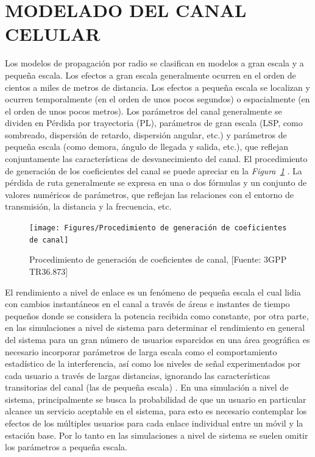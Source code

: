 \section{MODELADO DEL CANAL CELULAR}

Los modelos de propagación por radio se clasifican en modelos a gran escala y a pequeña escala. Los efectos a gran escala generalmente ocurren en el orden de cientos a miles de metros de distancia. Los efectos a pequeña escala se localizan y ocurren temporalmente (en el orden de unos pocos segundos) o espacialmente (en el orden de unos pocos metros). Los parámetros del canal generalmente se dividen en Pérdida por trayectoria (PL), parámetros de gran escala (LSP, como sombreado, dispersión de retardo, dispersión angular, etc.) y parámetros de pequeña escala (como demora, ángulo de llegada y salida, etc.), que reflejan conjuntamente las características de desvanecimiento del canal. El procedimiento de generación de los coeficientes del canal se puede apreciar en la \textit{Figura~\ref{fig:Procedimiento de generacion de coeficientes de canal} }. La pérdida de ruta generalmente se expresa en una o dos fórmulas y un conjunto de valores numéricos de parámetros, que reflejan las relaciones con el entorno de transmisión, la distancia y la frecuencia, etc. \newline

\begin{figure}[th]
\centering
\texttt{[image: Figures/Procedimiento de generación de coeficientes de canal]}
\decoRule
\caption[Procedimiento de generación de coeficientes de canal]{Procedimiento de generación de coeficientes de canal, [Fuente: 3GPP TR36.873]}
\label{fig:Procedimiento de generacion de coeficientes de canal}
\end{figure}

El rendimiento a nivel de enlace es un fenómeno de pequeña escala el cual lidia con cambios instantáneos en el canal a través de áreas e instantes de tiempo pequeños donde se considera la potencia recibida como constante, por otra parte, en las simulaciones a nivel de sistema para determinar el rendimiento en general del sistema para un gran número de usuarios esparcidos en una área geográfica es necesario incorporar parámetros de larga escala como el comportamiento estadístico de la interferencia, así como los niveles de señal experimentados por cada usuario a través de largas distancias, ignorando las características transitorias del canal (las de pequeña escala) \parencite{Tranter2003}. En una simulación a nivel de sistema, principalmente se busca la probabilidad de que un usuario en particular alcance un servicio aceptable en el sistema, para esto es necesario contemplar los efectos de los múltiples usuarios para cada enlace individual entre un móvil y la estación base. Por lo tanto en las simulaciones a nivel de sistema se suelen omitir los parámetros a pequeña escala.\newline

